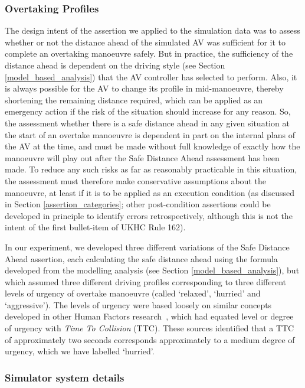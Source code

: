 \subsubsection{Overtaking Profiles} \label{overtaking_profiles}
The design intent of the assertion we applied to the simulation data was to assess whether or not the distance ahead of the simulated AV was sufficient for it to complete an overtaking manoeuvre safely. But in practice, the sufficiency of the distance ahead is dependent on the driving style (see Section \ref{model_based_analysis}) that the AV controller has selected to perform. Also, it is always possible for the AV to change its profile in mid-manoeuvre, thereby shortening the remaining distance required, which can be applied as an emergency action if the risk of the situation should increase for any reason. 
So, the assessment whether there is a safe distance ahead in any given situation at the start of an overtake manoeuvre is dependent in part on the internal plans of the AV at the time, and must be made without full knowledge of exactly how the manoeuvre will play out after the Safe Distance Ahead assessment has been made. To reduce any such risks as far as reasonably practicable in this situation, the assessment must therefore make conservative assumptions about the manoeuvre, at least if it is to be applied as an execution condition (as discussed in Section \ref{assertion_categories}; other post-condition assertions could be developed in principle to identify errors retrospectively, although this is not the intent of the first bullet-item of UKHC Rule 162).

In our experiment, we developed three different variations of the Safe Distance Ahead assertion, each calculating the safe distance ahead using the formula developed from the modelling analysis (see Section \ref{model_based_analysis}), but which assumed three different driving profiles corresponding to three different levels of urgency of overtake manoeuvre (called `relaxed', `hurried' and `aggressive'). The levels of urgency were based loosely on similar concepts developed in other Human Factors research~\cite{Chen2015,wang2019analysis}, which had equated level or degree of urgency with \emph{Time To Collision} (TTC). These sources identified that a TTC of approximately two seconds corresponds approximately to a medium degree of urgency, which we have labelled `hurried'.  

\subsubsection{Simulator system details}

